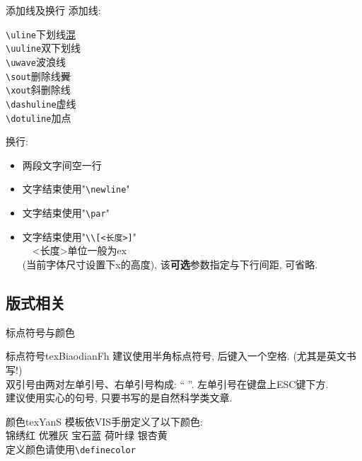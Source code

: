 \documentclass[hyperref,UTF8,11pt,CJK]{beamer}
\begin{document}
\begin{frame}[fragile]{添加线及换行}
	\onslide<1->
	添加线:
	\begin{multicols}{2}
		\verb|\uline|\hfill 下划线\qquad\uline{混}\\
		\verb|\uuline|\hfill 双下划线\qquad{}\\
		\verb|\uwave|\hfill 波浪线\qquad{}\\
		\verb|\sout|\hfill 删除线\qquad\sout{翼}\\
		\verb|\xout|\hfill 斜删除线\qquad{}\\
		\verb|\dashuline|\hfill 虚线\qquad{}\\
		\verb|\dotuline|\hfill 加点\qquad{}
	\end{multicols}
	换行:
	\begin{multicols}{2}
		\begin{itemize}
			\item 两段文字间空一行
			\item 文字结束使用"\verb!\newline!"
			\item 文字结束使用"\verb!\par!"
			\item 文字结束使用"\verb!\\[<长度>]!"\\
			~~<长度>单位一般为ex\\(当前字体尺寸设置下x的高度), 该\textbf{可选}参数指定与下行间距, 可省略.
		\end{itemize}
	\end{multicols}
\end{frame}

\subsection{版式相关}
\begin{frame}[fragile]{标点符号与颜色}
	\scriptsize
	\begin{scushow}{标点符号}{tex}{}{BiaodianFh}
		建议使用半角标点符号, 后键入一个空格. (尤其是英文书写!)\\[1ex]
		双引号由两对左单引号、右单引号构成: ``  ''. 左单引号在键盘上ESC键下方.\\[1ex]
		建议使用实心的句号, 只要书写的是自然科学类文章.
	\end{scushow}
	\begin{scushow}{颜色}{tex}{}{YanS}
		模板依VIS手册定义了以下颜色:\\
		\textcolor{JXred}{锦绣红}
		\textcolor{YYgrey}{优雅灰}
		\textcolor{BSblue}{宝石蓝}
		\textcolor{HYgreen}{荷叶绿}
		\textcolor{YXyellow}{银杏黄}\\
		定义颜色请使用\verb|\definecolor|
	\end{scushow}
\end{frame}
	
\end{document}
